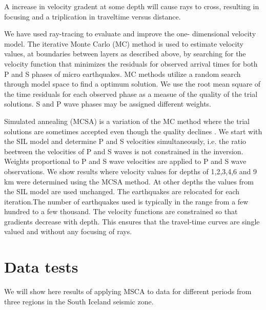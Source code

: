 \documentclass[extra]{gji}
\begin{document}
A increase in velocity gradent at some depth will cause rays to cross, resulting in 
focusing and a triplication in 
traveltime versus distance.

We have  used ray-tracing to evaluate and improve the one-
dimensional velocity model. The iterative Monte Carlo (MC) method is used
to estimate velocity values, at boundaries between layers as described
above, by searching for the velocity function that minimizes the
residuals for observed arrival times for both P and S phases of micro
earthquakes.
MC methods utilize a random search through model space to find a
optimum solution. We use the root mean square of the time
residuals for each observed phase as a measue of the quality of the
trial solutions. S and P wave phases may be assigned different weights.

Simulated annealing (MCSA) is a variation of the MC
method where the trial solutions are sometimes accepted even though
the quality declines \citep{menke13}.
We start with the SIL model and determine P and S velocities
simultaneously, i.e. the ratio beetween the velocities of P and S waves
is not constrained in the inversion. Weights proportional to P and S
wave velocities are applied to P and S wave observations. We show
results where velocity values for depths of 1,2,3,4,6 and 9 km were
determined using the MCSA method. At other depths the values from
the SIL model are used unchanged. The earthquakes are relocated for
each iteration.The number of earthquakes used is typically in the
range from a few hundred to a few thousand. The velocity functions
are constrained so that gradients decrease with depth. This ensures
that the travel-time curves are single valued and without any focusing
of rays.

\section{Data tests}
We will show here results of applying MSCA to data for different periods 
from three regions in the South Iceland seismic zone.




\bsp %

\label{lastpage}
\end{document}

